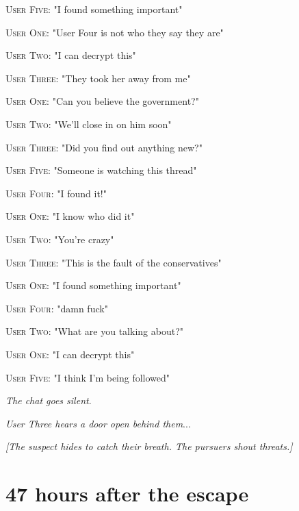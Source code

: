 \documentclass{report}
\begin{document}
\textsc{User Five}: "I found something important" 

\textsc{User One}: "User Four is not who they say they are" 

\textsc{User Two}: "I can decrypt this" 

\textsc{User Three}: "They took her away from me" 

\textsc{User One}: "Can you believe the government?" 

\textsc{User Two}: "We'll close in on him soon" 

\textsc{User Three}: "Did you find out anything new?" 

\textsc{User Five}: "Someone is watching this thread" 

\textsc{User Four}: "I found it!" 

\textsc{User One}: "I know who did it" 

\textsc{User Two}: "You're crazy" 

\textsc{User Three}: "This is the fault of the conservatives" 

\textsc{User One}: "I found something important" 

\textsc{User Four}: "damn fuck" 

\textsc{User Two}: "What are you talking about?" 

\textsc{User One}: "I can decrypt this" 

\textsc{User Five}: "I think I'm being followed" 

\textit{The chat goes silent}. 

\textit{User Three hears a door open behind them}...

\textit{[The suspect hides to catch their breath. The pursuers shout threats.]}


\section*{47 \small{hours after the escape}}
\end{document}
